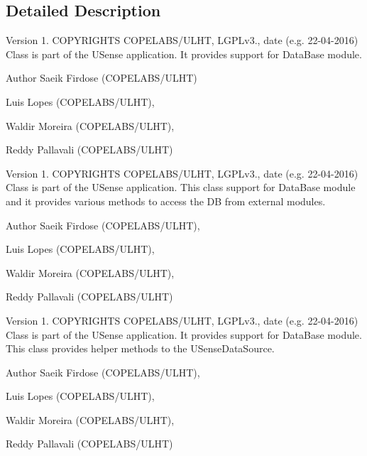 \subsection{Detailed Description}
\begin{DoxyVersion}{Version}
1. C\+O\+P\+Y\+R\+I\+G\+H\+T\+S C\+O\+P\+E\+L\+A\+B\+S/\+U\+L\+H\+T, L\+G\+P\+Lv3., date (e.\+g. 22-\/04-\/2016) Class is part of the U\+Sense application. It provides support for Data\+Base module. 
\end{DoxyVersion}
\begin{DoxyAuthor}{Author}
Saeik Firdose (C\+O\+P\+E\+L\+A\+B\+S/\+U\+L\+H\+T) 

Luis Lopes (C\+O\+P\+E\+L\+A\+B\+S/\+U\+L\+H\+T), 

Waldir Moreira (C\+O\+P\+E\+L\+A\+B\+S/\+U\+L\+H\+T), 

Reddy Pallavali (C\+O\+P\+E\+L\+A\+B\+S/\+U\+L\+H\+T)
\end{DoxyAuthor}
\begin{DoxyVersion}{Version}
1. C\+O\+P\+Y\+R\+I\+G\+H\+T\+S C\+O\+P\+E\+L\+A\+B\+S/\+U\+L\+H\+T, L\+G\+P\+Lv3., date (e.\+g. 22-\/04-\/2016) Class is part of the U\+Sense application. This class support for Data\+Base module and it provides various methods to access the D\+B from external modules. 
\end{DoxyVersion}
\begin{DoxyAuthor}{Author}
Saeik Firdose (C\+O\+P\+E\+L\+A\+B\+S/\+U\+L\+H\+T), 

Luis Lopes (C\+O\+P\+E\+L\+A\+B\+S/\+U\+L\+H\+T), 

Waldir Moreira (C\+O\+P\+E\+L\+A\+B\+S/\+U\+L\+H\+T), 

Reddy Pallavali (C\+O\+P\+E\+L\+A\+B\+S/\+U\+L\+H\+T)
\end{DoxyAuthor}
\begin{DoxyVersion}{Version}
1. C\+O\+P\+Y\+R\+I\+G\+H\+T\+S C\+O\+P\+E\+L\+A\+B\+S/\+U\+L\+H\+T, L\+G\+P\+Lv3., date (e.\+g. 22-\/04-\/2016) Class is part of the U\+Sense application. It provides support for Data\+Base module. This class provides helper methods to the U\+Sense\+Data\+Source. 
\end{DoxyVersion}
\begin{DoxyAuthor}{Author}
Saeik Firdose (C\+O\+P\+E\+L\+A\+B\+S/\+U\+L\+H\+T), 

Luis Lopes (C\+O\+P\+E\+L\+A\+B\+S/\+U\+L\+H\+T), 

Waldir Moreira (C\+O\+P\+E\+L\+A\+B\+S/\+U\+L\+H\+T), 

Reddy Pallavali (C\+O\+P\+E\+L\+A\+B\+S/\+U\+L\+H\+T) 
\end{DoxyAuthor}
